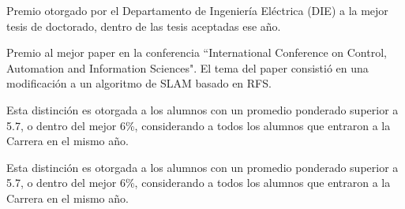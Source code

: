 \documentclass{article}
\begin{document}
\begin{cvevent}[2024]
	Premio otorgado por el Departamento de Ingeniería Eléctrica (DIE) a la mejor tesis de doctorado, dentro de las tesis aceptadas ese año.
\end{cvevent}
\begin{cvevent}[2013]
	Premio al mejor paper en la conferencia ``International Conference on Control, Automation
	and Information Sciences". El tema del paper consistió en una modificación a un algoritmo de
	SLAM basado en RFS.
\end{cvevent}
\begin{cvevent}[2011]
	Esta distinción es otorgada a los alumnos con un promedio ponderado superior a 5.7, o dentro
	del mejor 6\%, considerando a todos los alumnos que entraron a la Carrera en el mismo año.
\end{cvevent}

\begin{cvevent}[2007][2009]
	Esta distinción es otorgada a los alumnos con un promedio ponderado superior a 5.7, o dentro
	del mejor 6\%, considerando a todos los alumnos que entraron a la Carrera en el mismo año.
\end{cvevent}
\end{document}
